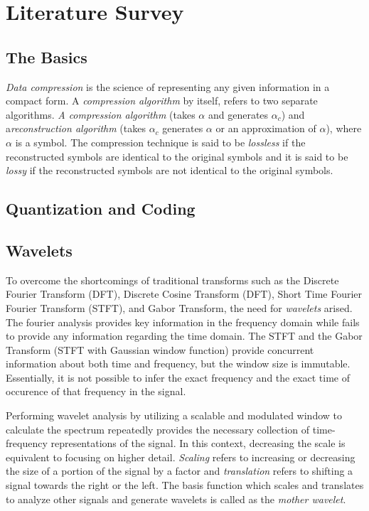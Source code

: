 \documentclass[./A14_Report.tex]{subfiles}
\begin{document}
\chapter{Literature Survey}

\section{The Basics}%
\label{sec:the_basics}

\textit{Data compression} is the science of representing any given information
in a compact form. A \textit{compression algorithm} by itself, refers to two separate 
algorithms. \textit{A compression algorithm} (takes $\alpha$ and generates $\alpha_c$) 
and a\textit {reconstruction algorithm} (takes $\alpha_c$ generates $\alpha$ or an approximation of $\alpha$), 
where $\alpha$ is a symbol. The compression technique is said 
to be \textit{lossless} if the reconstructed symbols are identical to the original symbols 
and it is said to be \textit{lossy} if the  reconstructed symbols are not identical to the original symbols.

\section{Quantization and Coding}%
\label{sec:quantization_and_coding}

\section{Wavelets}%
\label{sec:the_theory_of_wavelets}

To overcome the shortcomings of traditional transforms such as the 
Discrete Fourier Transform (DFT), Discrete Cosine Transform (DFT), 
Short Time Fourier Fourier Transform (STFT), and Gabor Transform, 
the need for \textit{wavelets} arised. The fourier analysis provides key information 
in the frequency domain while fails to provide any information regarding the time domain.
The STFT and the Gabor Transform (STFT with Gaussian window function) provide concurrent
information about both time and frequency, but the window size is immutable.
Essentially, it is not possible to infer the exact frequency and the exact time of 
occurence of that frequency in the signal.

\par

Performing wavelet analysis by utilizing a scalable and modulated window to calculate the
spectrum repeatedly provides the necessary collection of time-frequency representations 
of the signal. In this context, decreasing the scale is equivalent to focusing on higher
detail. \textit{Scaling} refers to increasing or decreasing the size of a portion of the signal 
by a factor and \textit{translation} refers to shifting a signal towards the right or the left.
The basis function which scales and translates to analyze other signals and generate
wavelets is called as the \textit{mother wavelet}. 
\end{document}

